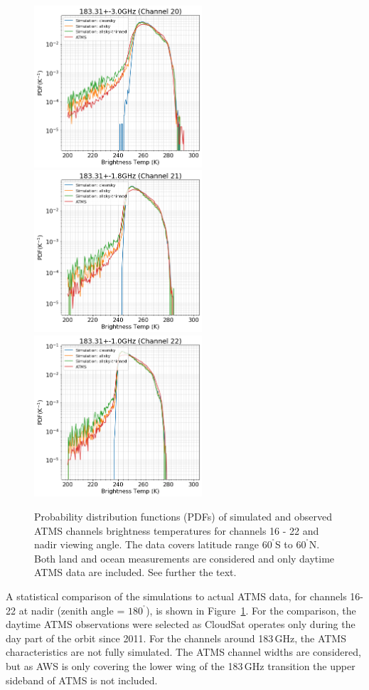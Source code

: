 \documentclass[12pt]{article}
\newcommand{\degree}{\ensuremath{\mathrm{^\circ}}}
\begin{document}
\begin{figure}[p]
	\includegraphics[height=60mm]{ATMS_C20_distribution}\hspace{5mm}%
	\includegraphics[height=60mm]{ATMS_C21_distribution}
	\includegraphics[height=60mm]{ATMS_C22_distribution}
	\caption{Probability distribution functions (PDFs) of simulated and
      observed ATMS channels brightness temperatures for channels 16 - 22 and
      nadir viewing angle. The data covers latitude range $60^{\degree}$S to
      $60^{\degree}$N. Both land and ocean measurements are considered and only
      daytime ATMS data are included. See further the text.}
	\label{fig:pdf:c16-22}
\end{figure}


A statistical comparison of the simulations to actual ATMS data, for channels
16-22 at nadir (zenith angle = $180^{\degree}$), is shown in
Figure~\ref{fig:pdf:c16-22}. For the comparison, the daytime ATMS observations
were selected as CloudSat operates only during the day part of the orbit since
2011. For the channels around 183\,GHz, the ATMS characteristics are not fully
simulated. The ATMS channel widths are considered, but as AWS is only covering
the lower wing of the 183\,GHz transition the upper sideband of ATMS is not
included.
\end{document}
